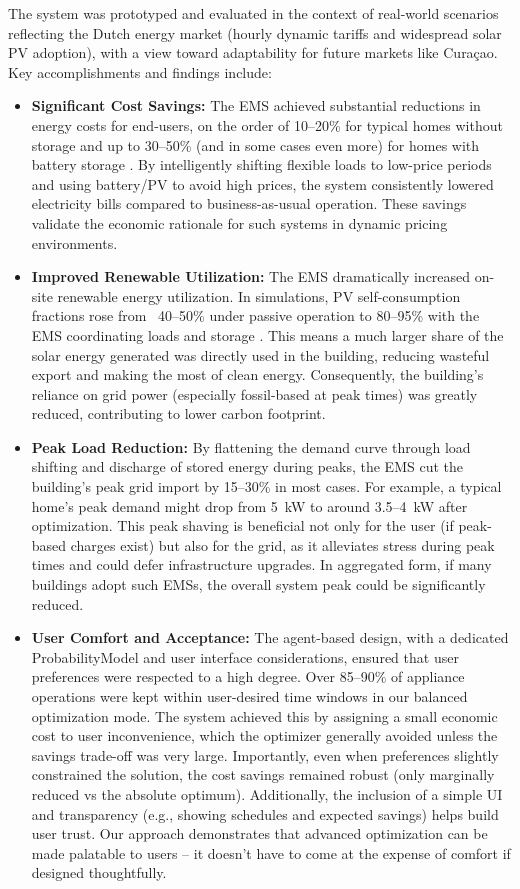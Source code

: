 \documentclass[12pt,a4paper]{article}
\begin{document}
The system was prototyped and evaluated in the context of real-world scenarios reflecting the Dutch energy market (hourly dynamic tariffs and widespread solar PV adoption), with a view toward adaptability for future markets like Curaçao. Key accomplishments and findings include:
\begin{itemize}
    \item \textbf{Significant Cost Savings:} The EMS achieved substantial reductions in energy costs for end-users, on the order of 10–20\% for typical homes without storage and up to 30–50\% (and in some cases even more) for homes with battery storage \cite{AlSorour2022, Mahmoudi2020}. By intelligently shifting flexible loads to low-price periods and using battery/PV to avoid high prices, the system consistently lowered electricity bills compared to business-as-usual operation. These savings validate the economic rationale for such systems in dynamic pricing environments.
    \item \textbf{Improved Renewable Utilization:} The EMS dramatically increased on-site renewable energy utilization. In simulations, PV self-consumption fractions rose from ~40–50\% under passive operation to 80–95\% with the EMS coordinating loads and storage \cite{Yoshida2018, TostadoVeliz2023}. This means a much larger share of the solar energy generated was directly used in the building, reducing wasteful export and making the most of clean energy. Consequently, the building's reliance on grid power (especially fossil-based at peak times) was greatly reduced, contributing to lower carbon footprint.
    \item \textbf{Peak Load Reduction:} By flattening the demand curve through load shifting and discharge of stored energy during peaks, the EMS cut the building’s peak grid import by 15–30\% in most cases. For example, a typical home’s peak demand might drop from 5~kW to around 3.5–4~kW after optimization. This peak shaving is beneficial not only for the user (if peak-based charges exist) but also for the grid, as it alleviates stress during peak times and could defer infrastructure upgrades. In aggregated form, if many buildings adopt such EMSs, the overall system peak could be significantly reduced.
    \item \textbf{User Comfort and Acceptance:} The agent-based design, with a dedicated ProbabilityModel and user interface considerations, ensured that user preferences were respected to a high degree. Over 85–90\% of appliance operations were kept within user-desired time windows in our balanced optimization mode. The system achieved this by assigning a small economic cost to user inconvenience, which the optimizer generally avoided unless the savings trade-off was very large. Importantly, even when preferences slightly constrained the solution, the cost savings remained robust (only marginally reduced vs the absolute optimum). Additionally, the inclusion of a simple UI and transparency (e.g., showing schedules and expected savings) helps build user trust. Our approach demonstrates that advanced optimization can be made palatable to users – it doesn’t have to come at the expense of comfort if designed thoughtfully.

\end{itemize}
\end{document}
